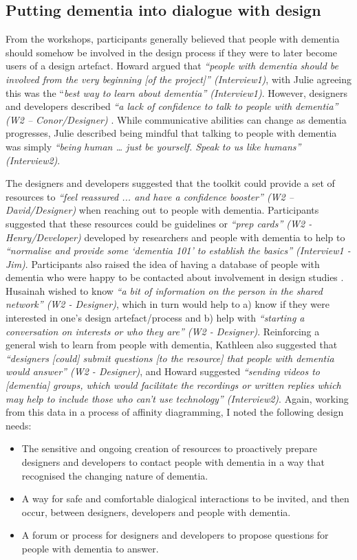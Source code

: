 \subsection{Putting dementia into dialogue with design}
From the workshops, participants generally believed that people with dementia should somehow be involved in the design process if they were to later become users of a design artefact. Howard argued that \textit{``people with dementia should be involved from the very beginning [of the project]'' (Interview1)}, with Julie agreeing this was the ``\textit{best way to learn about dementia'' (Interview1)}. However, designers and developers described \textit{``a lack of confidence to talk to people with dementia'' (W2 – Conor/Designer)} . While communicative abilities can change as dementia progresses, Julie described being mindful that talking to people with dementia was simply \textit{``being human … just be yourself. Speak to us like humans'' (Interview2)}.


The designers and developers suggested that the toolkit could provide a set of resources to \textit{``feel reassured ... and have a confidence booster'' (W2 – David/Designer)} when reaching out to people with dementia. Participants suggested that these resources could be guidelines or \textit{``prep cards'' (W2 - Henry/Developer)} developed by researchers and people with dementia to help to \textit{``normalise and provide some ‘dementia 101’ to establish the basics'' (Interview1 - Jim)}. Participants also raised the idea of having a database of people with dementia who were happy to be contacted about involvement in design studies . Husainah wished to know \textit{``a bit of information on the person in the shared network'' (W2 - Designer)}, which in turn would help to a) know if they were interested in one's design artefact/process and b) help with \textit{``starting a conversation on interests or who they are'' (W2 - Designer)}.
Reinforcing a general wish to learn from people with dementia, Kathleen also suggested that \textit{``designers [could] submit questions [to the resource] that people with dementia would answer'' (W2 - Designer)}, and Howard suggested \textit{``sending videos to [dementia] groups, which would facilitate the recordings or written replies which may help to include those who can't use technology'' (Interview2)}. Again, working from this data in a process of affinity diagramming, I noted the following design needs:
\begin{itemize}
\item The sensitive and ongoing creation of resources to proactively prepare designers and developers to contact people with dementia in a way that recognised the changing nature of dementia. 
\item A way for safe and comfortable dialogical interactions to be invited, and then occur, between designers, developers and people with dementia.
\item A forum or process for designers and developers to propose questions for people with dementia to answer.
\end{itemize}

